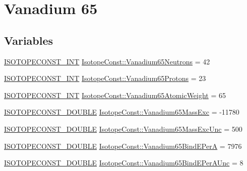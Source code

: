 \hypertarget{group___isotope_const-_vanadium-_v65}{}\section{Vanadium 65}
\label{group___isotope_const-_vanadium-_v65}
\subsection*{Variables}
\begin{DoxyCompactItemize}
\item 
\mbox{\hyperlink{group___isotope_const-_macros_ga5f18360b3e99483a35c32d789e62621c}{I\+S\+O\+T\+O\+P\+E\+C\+O\+N\+S\+T\+\_\+\+I\+NT}} \mbox{\hyperlink{group___isotope_const-_vanadium-_v65_gaeefca1b1173fd35e8a4c9c31e2a463f3}{Isotope\+Const\+::\+Vanadium65\+Neutrons}} = 42
\item 
\mbox{\hyperlink{group___isotope_const-_macros_ga5f18360b3e99483a35c32d789e62621c}{I\+S\+O\+T\+O\+P\+E\+C\+O\+N\+S\+T\+\_\+\+I\+NT}} \mbox{\hyperlink{group___isotope_const-_vanadium-_v65_ga966b4658af5c99de0475b290b545f120}{Isotope\+Const\+::\+Vanadium65\+Protons}} = 23
\item 
\mbox{\hyperlink{group___isotope_const-_macros_ga5f18360b3e99483a35c32d789e62621c}{I\+S\+O\+T\+O\+P\+E\+C\+O\+N\+S\+T\+\_\+\+I\+NT}} \mbox{\hyperlink{group___isotope_const-_vanadium-_v65_ga189df2ef80cf5ccba6736092bb1f7b82}{Isotope\+Const\+::\+Vanadium65\+Atomic\+Weight}} = 65
\item 
\mbox{\hyperlink{group___isotope_const-_macros_ga8f45a7272ce02c0b4c65c44636ed719a}{I\+S\+O\+T\+O\+P\+E\+C\+O\+N\+S\+T\+\_\+\+D\+O\+U\+B\+LE}} \mbox{\hyperlink{group___isotope_const-_vanadium-_v65_gaab2dbf4d8a238cef86316a9eec1a65a8}{Isotope\+Const\+::\+Vanadium65\+Mass\+Exc}} = -\/11780
\item 
\mbox{\hyperlink{group___isotope_const-_macros_ga8f45a7272ce02c0b4c65c44636ed719a}{I\+S\+O\+T\+O\+P\+E\+C\+O\+N\+S\+T\+\_\+\+D\+O\+U\+B\+LE}} \mbox{\hyperlink{group___isotope_const-_vanadium-_v65_ga1a157843b80a9b72aa3b9cc9b0b2b98b}{Isotope\+Const\+::\+Vanadium65\+Mass\+Exc\+Unc}} = 500
\item 
\mbox{\hyperlink{group___isotope_const-_macros_ga8f45a7272ce02c0b4c65c44636ed719a}{I\+S\+O\+T\+O\+P\+E\+C\+O\+N\+S\+T\+\_\+\+D\+O\+U\+B\+LE}} \mbox{\hyperlink{group___isotope_const-_vanadium-_v65_gad388f0704fa92758c4aea38af311f61c}{Isotope\+Const\+::\+Vanadium65\+Bind\+E\+PerA}} = 7976
\item 
\mbox{\hyperlink{group___isotope_const-_macros_ga8f45a7272ce02c0b4c65c44636ed719a}{I\+S\+O\+T\+O\+P\+E\+C\+O\+N\+S\+T\+\_\+\+D\+O\+U\+B\+LE}} \mbox{\hyperlink{group___isotope_const-_vanadium-_v65_ga41e5c5157b5910274605b81463183f7d}{Isotope\+Const\+::\+Vanadium65\+Bind\+E\+Per\+A\+Unc}} = 8

\end{DoxyCompactItemize}
